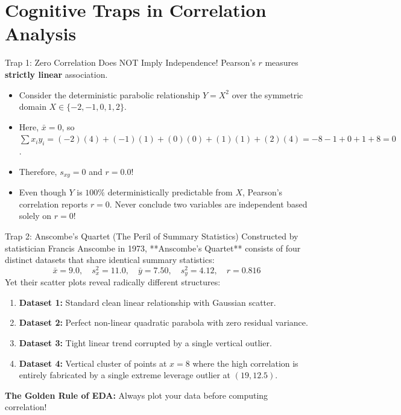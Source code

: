 \section{Cognitive Traps in Correlation Analysis}

\begin{trapbox}{Trap 1: Zero Correlation Does NOT Imply Independence!}
Pearson's $r$ measures \textbf{strictly linear} association.
\begin{itemize}
    \item Consider the deterministic parabolic relationship $Y = X^2$ over the symmetric domain $X \in \{-2, -1, 0, 1, 2\}$.
    \item Here, $\bar{x} = 0$, so $\sum x_i y_i = (-2)(4) + (-1)(1) + (0)(0) + (1)(1) + (2)(4) = -8 - 1 + 0 + 1 + 8 = 0$.
    \item Therefore, $s_{xy} = 0$ and $r = 0.0$!
    \item Even though $Y$ is $100\%$ deterministically predictable from $X$, Pearson's correlation reports $r = 0$. Never conclude two variables are independent based solely on $r = 0$!
\end{itemize}
\end{trapbox}

\begin{trapbox}{Trap 2: Anscombe's Quartet (The Peril of Summary Statistics)}
Constructed by statistician Francis Anscombe in 1973, **Anscombe's Quartet** consists of four distinct datasets that share identical summary statistics:
$$\bar{x} = 9.0, \quad s_x^2 = 11.0, \quad \bar{y} = 7.50, \quad s_y^2 = 4.12, \quad r = 0.816$$
Yet their scatter plots reveal radically different structures:
\begin{enumerate}
    \item \textbf{Dataset 1:} Standard clean linear relationship with Gaussian scatter.
    \item \textbf{Dataset 2:} Perfect non-linear quadratic parabola with zero residual variance.
    \item \textbf{Dataset 3:} Tight linear trend corrupted by a single vertical outlier.
    \item \textbf{Dataset 4:} Vertical cluster of points at $x=8$ where the high correlation is entirely fabricated by a single extreme leverage outlier at $(19, 12.5)$.
\end{enumerate}
\textbf{The Golden Rule of EDA:} Always plot your data before computing correlation!
\end{trapbox}

